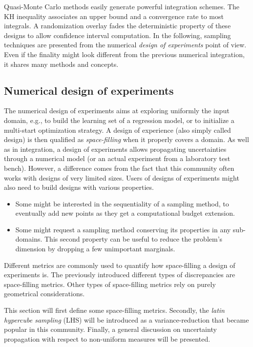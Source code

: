 Quasi-Monte Carlo methods easily generate powerful integration schemes. 
The KH inequality associates an upper bound and a convergence rate to most integrals. 
A randomization overlay fades the deterministic property of these designs to allow confidence interval computation.
In the following, sampling techniques are presented from the numerical \textit{design of experiments} point of view. 
Even if the finality might look different from the previous numerical integration, it shares many methods and concepts. 



\subsection{Numerical design of experiments}
The numerical design of experiments aims at exploring uniformly the input domain, e.g., to build the learning set of a regression model, or to initialize a multi-start optimization strategy. 
A design of experience (also simply called design) is then qualified as \textit{space-filling} when it properly covers a domain. 
As well as in integration, a design of experiments allows propagating uncertainties through a numerical model (or an actual experiment from a laboratory test bench). 
However, a difference comes from the fact that this community often works with designs of very limited sizes. 
Users of designs of experiments might also need to build designs with various properties. 
\begin{itemize}
    \item Some might be interested in the sequentiality of a sampling method, to eventually add new points as they get a computational budget extension.
    \item Some might request a sampling method conserving its properties in any sub-domains. 
    This second property can be useful to reduce the problem's dimension by dropping a few unimportant marginals.
\end{itemize}

Different metrics are commonly used to quantify how space-filling a design of experiments is. 
The previously introduced different types of discrepancies are space-filling metrics.
Other types of space-filling metrics rely on purely geometrical considerations.  

This section will first define some space-filling metrics.
Secondly, the \textit{latin hypercube sampling} (LHS) will be introduced as a variance-reduction that became popular in this community. 
Finally, a general discussion on uncertainty propagation with respect to non-uniform measures will be presented.

